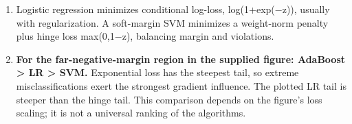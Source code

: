 
\begin{enumerate}[start=1]

\item Logistic regression minimizes conditional log-loss, log(1+exp(\ensuremath{-}z)), usually with regularization. A soft-margin SVM minimizes a weight-norm penalty plus hinge loss max(0,1\ensuremath{-}z), balancing margin and violations.

\item \textbf{For the far-negative-margin region in the supplied figure: AdaBoost > LR > SVM.} Exponential loss has the steepest tail, so extreme misclassifications exert the strongest gradient influence. The plotted LR tail is steeper than the hinge tail. This comparison depends on the figure’s loss scaling; it is not a universal ranking of the algorithms.

\end{enumerate}
